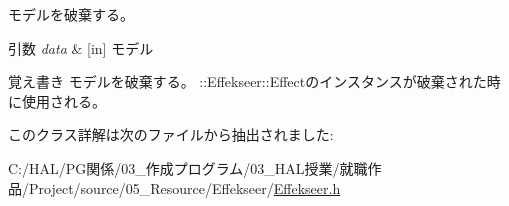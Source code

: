 モデルを破棄する。 


\begin{DoxyParams}{引数}
{\em data} & \mbox{[}in\mbox{]} モデル \\
\hline
\end{DoxyParams}
\begin{DoxyNote}{覚え書き}
モデルを破棄する。 \+::\+Effekseer\+::\+Effectのインスタンスが破棄された時に使用される。 
\end{DoxyNote}


このクラス詳解は次のファイルから抽出されました\+:\begin{DoxyCompactItemize}
\item 
C\+:/\+H\+A\+L/\+P\+G関係/03\+\_\+作成プログラム/03\+\_\+\+H\+A\+L授業/就職作品/\+Project/source/05\+\_\+\+Resource/\+Effekseer/\mbox{\hyperlink{_effekseer_8h}{Effekseer.\+h}}\end{DoxyCompactItemize}

